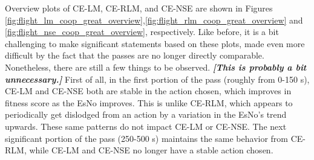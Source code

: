 \par Overview plots of CE-LM, CE-RLM, and CE-NSE are shown in Figures \ref{fig:flight_lm_coop_great_overview},\ref{fig:flight_rlm_coop_great_overview} and \ref{fig:flight_nse_coop_great_overview}, respectively. Like before, it is a bit challenging to make significant statements based on these plots, made even more difficult by the fact that the passes are no longer directly comparable. Nonetheless, there are still a few things to be observed. \textbf{\textit{[This is probably a bit unnecessary.]}} First of all, in the first portion of the pass (roughly from 0-150 s), CE-LM and CE-NSE both are stable in the action chosen, which improves in fitness score as the EsNo improves. This is unlike CE-RLM, which appears to periodically get dislodged from an action by a variation in the EsNo's trend upwards. These same patterns do not impact CE-LM or CE-NSE. The next significant portion of the pass (250-500 s) maintains the same behavior from CE-RLM, while CE-LM and CE-NSE no longer have a stable action chosen. 

